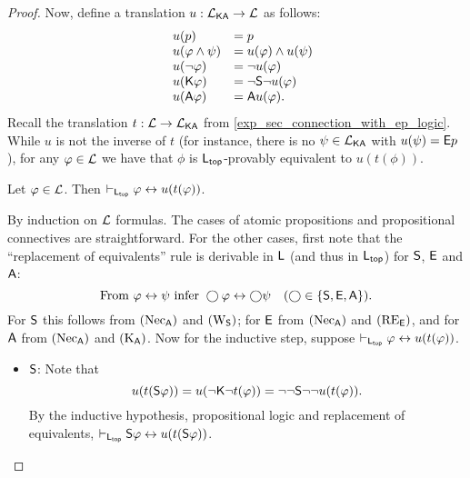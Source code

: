 \begin{proof}
Now, define a translation $u: \cLKA \to \cL$ as follows:
\[
\begin{array}{lll}
 &u(p) &= p \\
 &u(\phi \land \psi) &= u(\phi) \land u(\psi) \\
 &u(\neg\phi) &= \neg u(\phi) \\
 &u(\K\phi) &= \neg\S\neg u(\phi) \\
 &u(\A\phi) &= \A u(\phi).
\end{array}\]
Recall the translation $t: \cL \to \cLKA$ from
\cref{exp_sec_connection_with_ep_logic}. While $u$ is not the inverse of $t$ (for
instance, there is no $\psi \in \cLKA$ with $u(\psi) = \E p$), for any $\phi
\in \cL$ we have that $\phi$ is $\sLtop$-provably equivalent to $u(t(\phi))$.

\begin{claim}
\label{exp_claim_ut_equivalence}
Let $\phi \in \cL$. Then $\entails_{\sLtop}
\phi \liff u(t(\phi))$.
\end{claim}

\begin{claimproof}

By induction on $\cL$ formulas. The cases of atomic
propositions and propositional connectives are straightforward. For
the other cases, first note that the ``replacement of equivalents''
rule is derivable in $\sL$ (and thus in $\sLtop$) for
$\S$, $\E$ and $\A$:
\[
    \text{From } \phi \liff \psi \text{ infer } \bigcirc\phi \liff
    \bigcirc\psi \quad (\bigcirc \in \{\S, \E, \A\}).
\]
For $\S$ this follows from $\necuniv$ and $\weakeningS$; for $\E$ from
$\necuniv$ and $\reE$, and for $\A$ from $\necuniv$ and $\Kuniv$. Now for the
inductive step, suppose $\entails_{\sLtop} \phi \liff u(t(\phi))$.

\begin{itemize}
    \item $\S$: Note that
        \[
        u(t(\S\phi))
= u(\neg\K\neg t(\phi))
= \neg\neg\S\neg\neg u(t(\phi)).\]
        By the inductive hypothesis, propositional logic and replacement
of equivalents, $\entails_{\sLtop} \S\phi \liff
u(t(\S\phi))$.


\end{itemize}
\end{claimproof}
\end{proof}
